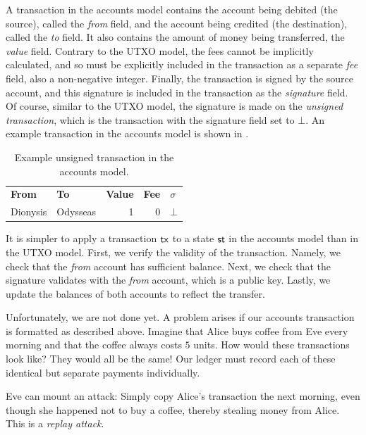 A transaction in the accounts
model contains the account being debited (the source), called the \emph{from} field, and the account
being credited (the destination), called the \emph{to} field. It also contains the amount of money being transferred,
the \emph{value} field. Contrary to the UTXO model, the fees cannot be implicitly calculated, and
so must be explicitly included in the transaction as a separate \emph{fee} field, also a non-negative
integer. Finally, the transaction is signed by the source account, and this signature is included in
the transaction as the \emph{signature} field. Of course, similar to the UTXO model, the signature is
made on the \emph{unsigned transaction}, which is the transaction with the signature field set to $\bot$.
An example transaction in the accounts model is shown in .

\begin{table}[htbp!]
\centering
    \begin{tabular}{|l|l|r|r|l|}
         \hline
         \textbf{From} & \textbf{To} & \textbf{Value} & \textbf{Fee} & \textbf{$\sigma$} \\
         \hhline{|=|=|=|=|=|}
         Dionysis & Odysseas & 1 & 0 & $\bot$ \\
         \hline
    \end{tabular}
    \caption{Example unsigned transaction in the accounts model.}
    \label{tbl.accountsTx}
\end{table}

It is simpler to apply a transaction $\mathsf{tx}$ to a state $\mathsf{st}$ in the accounts model than in the UTXO model.
First, we verify the validity of the transaction. Namely, we check that the \emph{from} account has sufficient balance.
Next, we check that the signature validates with the \emph{from} account, which is a public key. Lastly, we
update the balances of both accounts to reflect the transfer.

Unfortunately, we are not done yet.
A problem arises if our accounts transaction is formatted as described above. Imagine that Alice buys coffee
from Eve every morning and that the coffee always costs $5$ units. How would these transactions look like?
They would all be the same! Our ledger must record each of these identical but separate payments individually.

Eve can mount an attack: Simply copy Alice's transaction the next
morning, even though she happened not to buy a coffee, thereby stealing money from Alice. This is a \emph{replay attack}.

